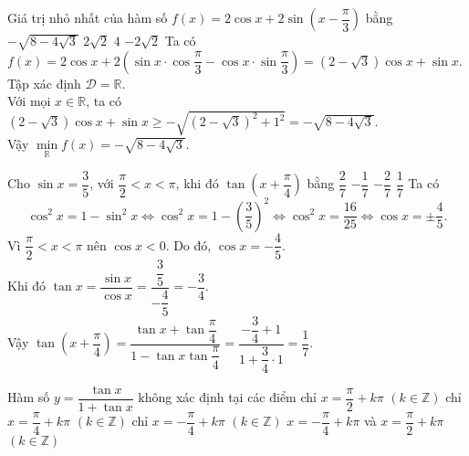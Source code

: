 \begin{ex}%
Giá trị nhỏ nhất của hàm số $f(x)=2\cos x + 2 \sin\left(x-\dfrac{\pi}{3}\right)$ bằng
\choice
{\True $-\sqrt{8-4\sqrt{3}}$}
{$2\sqrt{2}$}
{$4$}
{$-2\sqrt{2}$}
\loigiai
{Ta có $f(x)=2\cos x +2 \left(\sin x\cdot\cos \dfrac{\pi}{3}-\cos x \cdot \sin \dfrac{\pi}{3}\right)=\left(2-\sqrt{3}\right)\cos x+\sin x$. \\
Tập xác định $\mathscr{D} =\mathbb{R}$.\\
Với mọi $x\in \mathbb{R}$, ta có $\left(2-\sqrt{3}\right)\cos x+\sin x \geq-\sqrt{\left(2-\sqrt{3}\right)^2+1^2}=-\sqrt{8-4\sqrt{3}}$. \\
Vậy $\min\limits_{\mathbb{R}} f(x) = -\sqrt{8-4\sqrt{3}}$.
}
\end{ex}

\begin{ex}%
Cho $\sin x=\dfrac{3}{5}$, với $\dfrac{\pi }{2}<x<\pi$, khi đó $\tan \left(x+\dfrac{\pi}{4}\right)$ bằng
\choice
{$\dfrac{2}{7}$}
{$-\dfrac{1}{7}$}
{$-\dfrac{2}{7}$}
{\True $\dfrac{1}{7}$}
\loigiai
{
Ta có
\[\cos^2 x = 1-\sin^2 x \Leftrightarrow \cos^2 x = 1-\left(\dfrac{3}{5}\right)^2 \Leftrightarrow \cos^2 x = \dfrac{16}{25} \Leftrightarrow \cos x=\pm\dfrac{4}{5}.\]
Vì $\dfrac{\pi}{2}<x<\pi$ nên $\cos x<0$. Do đó, $\cos x=-\dfrac{4}{5}$.\\
Khi đó $\tan x = \dfrac{\sin x}{\cos x} = \dfrac{\dfrac{3}{5}}{-\dfrac{4}{5}} = -\dfrac{3}{4}$.\\
Vậy $\tan \left(x+\dfrac{\pi}{4}\right) = \dfrac{\tan x+\tan \dfrac{\pi}{4}}{1-\tan x\tan \dfrac{\pi}{4}}=\dfrac{-\dfrac{3}{4}+1}{1+\dfrac{3}{4}\cdot 1}=\dfrac{1}{7}$.
}
\end{ex}

\begin{ex}%
Hàm số $y=\dfrac{\tan x}{1+\tan x}$ không xác định tại các điểm
\choice
{chỉ $x=\dfrac{\pi}{2}+k\pi$ $\left( k \in \mathbb{Z} \right)$}
{chỉ $x=\dfrac{\pi}{4}+k\pi$ $\left( k \in \mathbb{Z} \right)$}
{chỉ $x=-\dfrac{\pi}{4}+k\pi$ $\left( k \in \mathbb{Z} \right)$}
{\True $x=-\dfrac{\pi}{4}+k\pi$ và $x=\dfrac{\pi}{2}+k\pi$ $\left( k \in \mathbb{Z} \right)$}
\end{ex}

